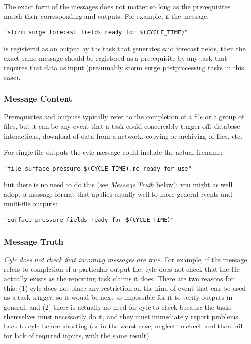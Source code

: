 \documentclass[11pt,a4paper]{article}
\begin{document}
The exact form of the messages does not matter so long as the
prerequisites match their corresponding and outputs. For example, if
the message, 
\begin{lstlisting}
"storm surge forecast fields ready for $(CYCLE_TIME)"
\end{lstlisting} 
is registered as an output by the task that generates said forecast
fields, then the exact same message should be registered as a
prerequisite by any task that requires that data as input
(presumably storm surge postprocessing tasks in this case). 

\subsubsection{Message Content}

Prerequisites and outputs typically refer to the completion of a file or
a group of files, but it can be any event that a task could conceivably
trigger off: database interactions, download of data from a network,
copying or archiving of files, etc.

For single file outputs the cylc message could include the actual
filename:
\begin{lstlisting}
"file surface-pressure-$(CYCLE_TIME).nc ready for use"
\end{lstlisting}
but there is no need to do this (see {\em Message Truth} below); you
might as well adopt a message format that applies equally well to
more general events and multi-file outputs:
\begin{lstlisting}
"surface pressure fields ready for $(CYCLE_TIME)"
\end{lstlisting}


\subsubsection{Message Truth}

{\em Cylc does not check that incoming messages are true.}  For example,
if the message refers to completion of a particular output file, cylc
does not check that the file actually exists as the reporting task
claims it does. There are two reasons for this: (1) cylc does not place
any restriction on the kind of event that can be used as a task trigger,
so it would be next to impossible for it to verify outputs in general,
and (2) there is actually no need for cylc to check because the tasks
themselves must necessarily do it, and they must immediately report
problems back to cylc before aborting (or in the worst case, neglect to
check and then fail for lack of required inputs, with the same result).
\end{document}
